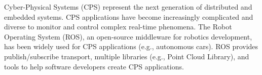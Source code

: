 \documentclass{sig-alternate-ipsn13}
\begin{document}
{%
}

\maketitle



Cyber-Physical Systems (CPS) represent the next generation of distributed and embedded systems. CPS applications have become increasingly complicated and diverse to monitor and control complex real-time phenomena. The Robot Operating System (ROS), an open-source middleware for robotics development, has been widely used for CPS applications (e.g., autonomous cars). ROS provides publish/subscribe transport, multiple libraries (e.g., Point Cloud Library), and tools to help software developers create CPS applications.
\end{document}
